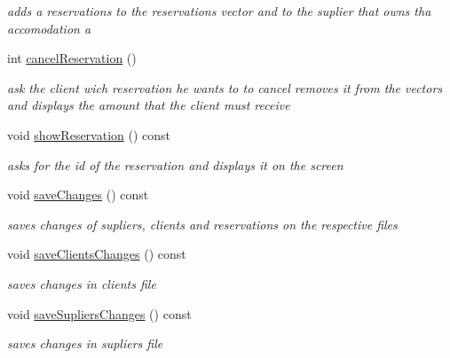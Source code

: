 \begin{DoxyCompactItemize}
\begin{DoxyCompactList}\small\item\em adds a reservations to the reservations vector and to the suplier that owns tha accomodation a \end{DoxyCompactList}\item 
int \hyperlink{class_company_ab3dbac165de998e1e711a6dba7cbbf51}{cancel\+Reservation} ()
\begin{DoxyCompactList}\small\item\em ask the client wich reservation he wants to to cancel removes it from the vectors and displays the amount that the client must receive \end{DoxyCompactList}\item 
\hypertarget{class_company_aec3da42cd9c40660c9b6478dfb246109}{}\label{class_company_aec3da42cd9c40660c9b6478dfb246109} 
void \hyperlink{class_company_aec3da42cd9c40660c9b6478dfb246109}{show\+Reservation} () const
\begin{DoxyCompactList}\small\item\em asks for the id of the reservation and displays it on the screen \end{DoxyCompactList}\item 
\hypertarget{class_company_a72134cd31bcd5a1bac08ad8e6235d28f}{}\label{class_company_a72134cd31bcd5a1bac08ad8e6235d28f} 
void \hyperlink{class_company_a72134cd31bcd5a1bac08ad8e6235d28f}{save\+Changes} () const
\begin{DoxyCompactList}\small\item\em saves changes of supliers, clients and reservations on the respective files \end{DoxyCompactList}\item 
\hypertarget{class_company_ae5cc3089ac58af98b1f4a0b3a7d7e7af}{}\label{class_company_ae5cc3089ac58af98b1f4a0b3a7d7e7af} 
void \hyperlink{class_company_ae5cc3089ac58af98b1f4a0b3a7d7e7af}{save\+Clients\+Changes} () const
\begin{DoxyCompactList}\small\item\em saves changes in clients file \end{DoxyCompactList}\item 
\hypertarget{class_company_a0c8230826db8ef8884e06e0fba61800e}{}\label{class_company_a0c8230826db8ef8884e06e0fba61800e} 
void \hyperlink{class_company_a0c8230826db8ef8884e06e0fba61800e}{save\+Supliers\+Changes} () const
\begin{DoxyCompactList}\small\item\em saves changes in supliers file \end{DoxyCompactList}\item 

\end{DoxyCompactItemize}
